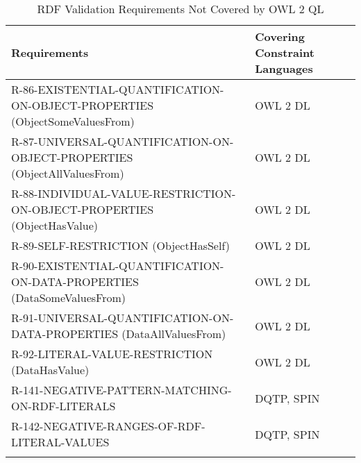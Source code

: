 \documentclass{llncs}
\newcommand{\hr}{\hline\noalign{\smallskip}} %
\begin{document}
\begin{table}
\caption{RDF Validation Requirements Not Covered by OWL 2 QL}
\label{tab:RequirementsNotCoveredOWL2QL-3}
\centering
\begin{tabular}{ll}
\hr
Requirements & Covering Constraint Languages \\
\hr
R-86-EXISTENTIAL-QUANTIFICATION-ON-OBJECT-PROPERTIES (ObjectSomeValuesFrom) & OWL 2 DL \\
R-87-UNIVERSAL-QUANTIFICATION-ON-OBJECT-PROPERTIES (ObjectAllValuesFrom) & OWL 2 DL \\
R-88-INDIVIDUAL-VALUE-RESTRICTION-ON-OBJECT-PROPERTIES (ObjectHasValue) & OWL 2 DL \\
R-89-SELF-RESTRICTION (ObjectHasSelf) & OWL 2 DL \\
R-90-EXISTENTIAL-QUANTIFICATION-ON-DATA-PROPERTIES (DataSomeValuesFrom) & OWL 2 DL \\
R-91-UNIVERSAL-QUANTIFICATION-ON-DATA-PROPERTIES (DataAllValuesFrom) & OWL 2 DL \\
R-92-LITERAL-VALUE-RESTRICTION (DataHasValue) & OWL 2 DL \\

R-141-NEGATIVE-PATTERN-MATCHING-ON-RDF-LITERALS & DQTP, SPIN \\
R-142-NEGATIVE-RANGES-OF-RDF-LITERAL-VALUES & DQTP, SPIN \\
\hr
\end{tabular}
\end{table}

{}

\setcounter{tocdepth}{1}
\end{document}
